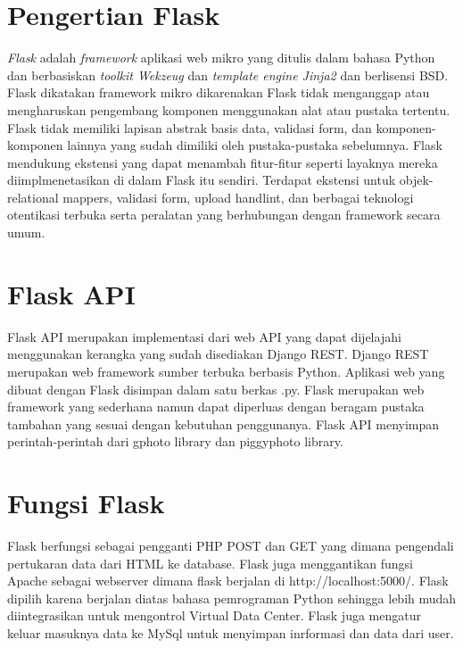 
\section{Pengertian Flask}
\emph{Flask} adalah \emph{framework} aplikasi web mikro yang ditulis dalam bahasa Python dan berbasiskan \emph{toolkit Wekzeug} dan \emph{template engine Jinja2} dan berlisensi BSD. Flask dikatakan framework mikro dikarenakan Flask tidak menganggap atau mengharuskan pengembang komponen menggunakan alat atau pustaka tertentu. Flask tidak memiliki lapisan abstrak basis data, validasi form, dan komponen-komponen lainnya yang sudah dimiliki oleh pustaka-pustaka sebelumnya. Flask mendukung ekstensi yang dapat menambah fitur-fitur seperti layaknya mereka diimplmenetasikan di dalam Flask itu sendiri. Terdapat ekstensi untuk objek-relational mappers, validasi form, upload handlint, dan berbagai teknologi otentikasi terbuka serta peralatan yang berhubungan dengan framework secara umum\cite{solihin2016implementasi}.

\section{Flask API}
Flask API merupakan implementasi dari web API yang dapat dijelajahi menggunakan kerangka yang sudah disediakan Django REST. Django REST merupakan web framework sumber terbuka berbasis Python. Aplikasi web yang dibuat dengan Flask disimpan dalam satu berkas .py. Flask merupakan web framework yang sederhana namun dapat diperluas dengan beragam pustaka tambahan yang sesuai dengan kebutuhan penggunanya. Flask API menyimpan perintah-perintah dari gphoto library dan piggyphoto library\cite{computingaplikasi}.

\section{Fungsi Flask}
Flask berfungsi sebagai pengganti PHP POST dan GET yang dimana pengendali pertukaran data dari HTML ke database. Flask juga menggantikan fungsi Apache sebagai webserver dimana flask berjalan di http://localhost:5000/.
Flask dipilih karena berjalan diatas bahasa pemrograman Python sehingga lebih mudah diintegrasikan untuk mengontrol Virtual Data Center. Flask juga mengatur keluar masuknya data ke MySql untuk menyimpan inrformasi dan data dari user\cite{alauddin2017implementasi}.

